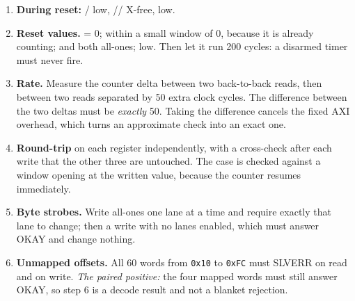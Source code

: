 \begin{enumerate}[leftmargin=*,itemsep=3pt]
\item[\textbf{1}] \textbf{During reset:} / low,
// X-free,  low.

\item[\textbf{2}] \textbf{Reset values.}  = 0;
 within a small window of 0, because it is already counting;
 and  both all-ones;  low. Then let
it run 200 cycles: a disarmed timer must never fire.

\item[\textbf{3}] \textbf{Rate.} Measure the counter delta between two
back-to-back reads, then between two reads separated by 50 extra clock cycles.
The difference between the two deltas must be \emph{exactly} 50. Taking the
difference cancels the fixed AXI overhead, which turns an approximate check into
an exact one.

\item[\textbf{4}] \textbf{Round-trip} on each register independently, with a
cross-check after each write that the other three are untouched. The
 case is checked against a window opening at the written value,
because the counter resumes immediately.

\item[\textbf{5}] \textbf{Byte strobes.} Write all-ones one lane at a time and
require exactly that lane to change; then a write with no lanes enabled, which
must answer OKAY and change nothing.

\item[\textbf{6}] \textbf{Unmapped offsets.} All 60 words from \texttt{0x10} to
\texttt{0xFC} must SLVERR on read and on write. \emph{The paired positive:} the
four mapped words must still answer OKAY, so step 6 is a decode result and not a
blanket rejection.


\end{enumerate}
